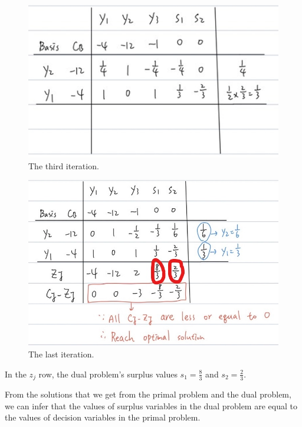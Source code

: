 \documentclass[a4paper,10pt]{article}
\begin{document}
\begin{enumerate}
\begin{enumerate}
{\begin{enumerate}
                \begin{figure}[H]
                    \centering
                    \includegraphics[scale=0.6]{./iter4.png}
                    \caption{The third iteration.}
                \end{figure}
                
                \begin{figure}[H]
                    \centering
                    \includegraphics[scale=0.4]{./iter5.jpg}
                    \caption{The last iteration.}
                \end{figure}

                In the $z_j$ row, the dual problem's surplus values $s_1 = \frac{8}{3}$ and $s_2 = \frac{2}{3}$.
            \end{enumerate}

            From the solutions that we get from the primal problem and the dual problem, 
            we can infer that the values of surplus variables in the dual problem are equal to the values of decision variables in the primal problem.
        }


\end{enumerate}
\end{enumerate}
\end{document}
